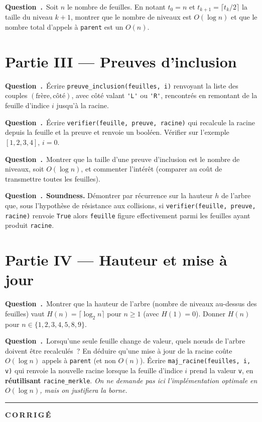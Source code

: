 \documentclass[11pt,a4paper]{article}
\newcounter{qcnt}
\newcommand{\Q}{\medskip\par\stepcounter{qcnt}\noindent\textbf{Question~\theqcnt.}~}
\newcommand{\code}[1]{\lstinline!#1!}
\begin{document}
\Q Soit $n$ le nombre de feuilles. En notant $t_0=n$ et $t_{k+1}=\lceil t_k/2\rceil$ la taille du
niveau $k+1$, montrer que le nombre de niveaux est $O(\log n)$ et que le nombre total d'appels à
\code{parent} est un $O(n)$.

\section*{Partie III --- Preuves d'inclusion}

\Q Écrire \code{preuve_inclusion(feuilles, i)} renvoyant la liste des couples
$(\text{frère}, \text{côté})$, avec côté valant \code{'L'} ou \code{'R'}, rencontrés en remontant
de la feuille d'indice $i$ jusqu'à la racine.

\Q Écrire \code{verifier(feuille, preuve, racine)} qui recalcule la racine depuis la feuille et
la preuve et renvoie un booléen. Vérifier sur l'exemple $[1,2,3,4]$, $i=0$.

\Q Montrer que la taille d'une preuve d'inclusion est le nombre de niveaux, soit $O(\log n)$, et
commenter l'intérêt (comparer au coût de transmettre toutes les feuilles).

\Q \textbf{Soundness.} Démontrer par récurrence sur la hauteur $h$ de l'arbre que, sous
l'hypothèse de résistance aux collisions, si \code{verifier(feuille, preuve, racine)} renvoie
\code{True} alors \code{feuille} figure effectivement parmi les feuilles ayant produit
\code{racine}.

\section*{Partie IV --- Hauteur et mise à jour}

\Q Montrer que la hauteur de l'arbre (nombre de niveaux au-dessus des feuilles) vaut
$H(n) = \lceil \log_2 n \rceil$ pour $n \ge 1$ (avec $H(1)=0$). Donner $H(n)$ pour
$n \in \{1,2,3,4,5,8,9\}$.

\Q Lorsqu'une seule feuille change de valeur, quels n\oe uds de l'arbre doivent être recalculés~?
En déduire qu'une mise à jour de la racine coûte $O(\log n)$ appels à \code{parent} (et non
$O(n)$). Écrire \code{maj_racine(feuilles, i, v)} qui renvoie la nouvelle racine lorsque la feuille
d'indice $i$ prend la valeur \code{v}, en \textbf{réutilisant} \code{racine_merkle}. \emph{On ne
demande pas ici l'implémentation optimale en $O(\log n)$, mais on justifiera la borne.}

\newpage
\setcounter{qcnt}{0}
\bigskip
\hrule
\bigskip
{\Large\bfseries C\,O\,R\,R\,I\,G\,É}
\medskip
\end{document}
